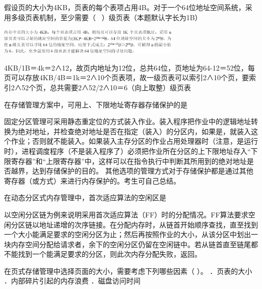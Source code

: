 \question 假设页的大小为4KB，页表的每个表项占用4B。对于一个64位地址空间系统，采用多级页表机制，至少需要（
~）级页表（本题默认字长为1B）
\par{}
\begin{solution}\includegraphics[width=3.46875in,height=0.50000in]{computerassets/243B0B774FFA6638E6FAB305AD26DD03.png}

4KB/1B＝4k＝2∧12，故页内地址为12位，总共64位，页地址为64-12＝52位，每页可以存放4KB/4B＝1k＝2∧10个页表项，故一级页表可以索引2∧10个页，要索引2∧52个页，总共需要2∧52/2∧10＝6（向上取整）级页表
\end{solution}
\question 在存储管理方案中，可用上、下限地址寄存器存储保护的是
\par{}
\begin{solution}固定分区管理可采用静态重定位的方式装入作业。装入程序把作业中的逻辑地址转换为绝对地址，并检查绝对地址是否在指定（装入）的分区内，如果是，就装入这个作业；否则就不能装入。如果装入主存分区的作业占用处理器时（注意，是运行时），进程调度程序（不是装入程序了）必须把作业所在分区的上下限地址存入``下限寄存器''和``上限寄存器''中，这样可以在指令执行中判断其所用到的绝对地址是否越界，达到存储保护的目的。
其他选项的管理方式对于存储保护都是通过其他寄存器（或方式）来进行内存保护的。考生可自己总结。
\end{solution}
\question 在动态分区式内存管理中，首次适应算法的空闲区是
\par{}
\begin{solution}以空闲分区链为例来说明采用首次适应算法（FF）时的分配情况。FF算法要求空闲分区链以地址递增的次序链接。在分配内存时，从链首开始顺序查找，直至找到一个大小能满足要求的空闲分区为止；然后再按照作业的大小，从该分区中划出一块内存空间分配给请求者，余下的空闲分区仍留在空闲链中。若从链首直至链尾都不能找到一个能满足要求的分区，则此次内存分配失败，返回。
\end{solution}
\question 在页式存储管理中选择页面的大小，需要考虑下列哪些因素（ ）。
．页表的大小 ．内部碎片引起的内存浪费 ．磁盘访问时间
\par{}
